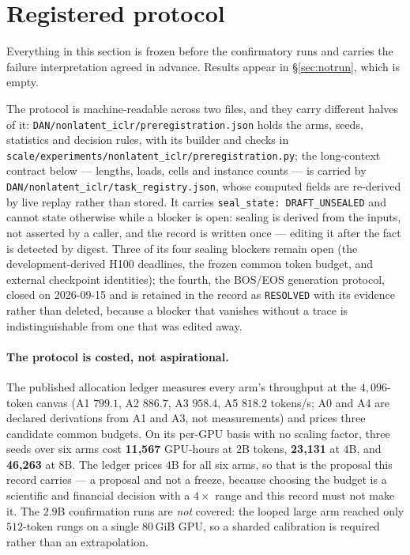 \documentclass[11pt]{article}
\begin{document}
\section{Registered protocol}
\label{sec:protocol}

Everything in this section is frozen before the confirmatory runs and carries the
failure interpretation agreed in advance. Results appear in \S\ref{sec:notrun}, which is
empty.

The protocol is machine-readable across two files, and they carry different halves of it:
\texttt{DAN/nonlatent\_iclr/preregistration.json} holds the arms, seeds, statistics and
decision rules, with its builder and checks in
\texttt{scale/experiments/nonlatent\_iclr/preregistration.py}; the long-context contract
below --- lengths, loads, cells and instance counts --- is carried by
\texttt{DAN/nonlatent\_iclr/task\_registry.json}, whose computed fields are re-derived by
live replay rather than stored.
It carries \texttt{seal\_state: DRAFT\_UNSEALED} and cannot state otherwise while a
blocker is open: sealing is derived from the inputs, not asserted by a caller, and the
record is written once --- editing it after the fact is detected by digest. Three of its
four sealing blockers remain open (the development-derived H100 deadlines, the frozen
common token budget, and external checkpoint identities); the fourth, the BOS/EOS
generation protocol, closed on 2026-09-15 and is retained in the record as
\texttt{RESOLVED} with its evidence rather than deleted, because a blocker that vanishes
without a trace is indistinguishable from one that was edited away.

\paragraph{The protocol is costed, not aspirational.} The published allocation ledger
measures every arm's throughput at the $4{,}096$-token canvas (A1 $799.1$, A2 $886.7$,
A3 $958.4$, A5 $818.2$ tokens/s; A0 and A4 are declared derivations from A1 and A3, not
measurements) and prices three candidate common budgets. On its per-GPU basis with no
scaling factor, three seeds over six arms cost \textbf{11{,}567} GPU-hours at $2$B
tokens, \textbf{23{,}131} at $4$B, and \textbf{46{,}263} at $8$B. The ledger prices $4$B
for all six arms, so that is the proposal this record carries --- a proposal and not a
freeze, because choosing the budget is a scientific and financial decision with a
$4\times$ range and this record must not make it. The $2.9$B confirmation runs are
\emph{not} covered: the looped large arm reached only $512$-token rungs on a single
$80$\,GiB GPU, so a sharded calibration is required rather than an extrapolation.
\end{document}
